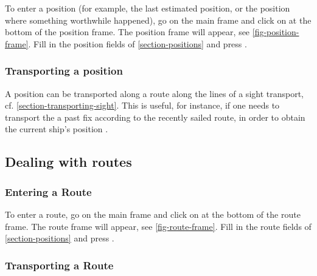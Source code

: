 \documentclass{ol-softwaremanual}
\begin{document}
To enter a position  (for example, the last estimated position, or the position where something worthwhile happened), go on the main frame and click on  at the bottom of the position frame. The position frame will appear, see \cref{fig-position-frame}. Fill in the position fields of \cref{section-positions} and press . 

\subsubsection{Transporting a position}\label{section-transport-position}

A position can be transported along a route along the lines of a sight transport, cf. \cref{section-transporting-sight}. This is useful, for instance, if one needs to transport the a past fix according to the recently sailed route, in order to obtain the current ship's position \cite{bowditch2002the}. 


\subsection{Dealing with routes}\label{section-routes}


\subsubsection{Entering a Route}\label{section-entering-route}

To enter a route, go on the main frame and click on  at the bottom of the route frame. The route frame will appear, see \cref{fig-route-frame}. Fill in the route fields of \cref{section-positions} and press . 

\subsubsection{Transporting a Route}\label{section-transporting-route}


\pagebreak
\printacronyms[pages={display=all,seq/use=false}]


\end{document}
